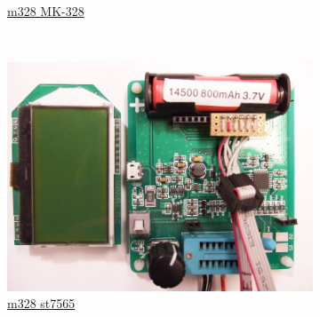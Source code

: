 \documentclass[pdftex,12pt,a4paper,english]{article}
\begin{document}
\begin{figure}[H]
\begin{subfigure}[b]{.3\textwidth}
	  \\ \vspace{-0.5em}
	  {\href{run:./trunk/mega328_MK-328/.}{m328 MK-328}}
  \end{subfigure}
~
  \begin{subfigure}[b]{.3\textwidth}
    \centering
    \includegraphics[width=1.\textwidth]{../PNG/m328_wei_st7565.JPG}
	  \\ \vspace{-0.5em}
	  {\href{run:./trunk/mega328_wei_st7565/.}{m328 st7565}}
  \end{subfigure}
\end{figure}
\vspace{-1em}
\end{document}
